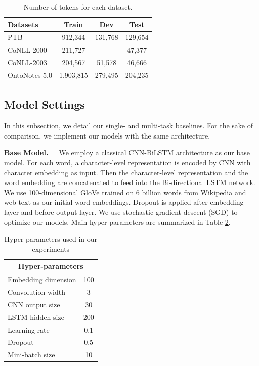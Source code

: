 \documentclass[letterpaper]{article} %
\begin{document}
\begin{table}[thbp]
\centering
\begin{tabular}{lccc}
\toprule
Datasets & Train & Dev & Test \\ \midrule
PTB & 912,344 & 131,768 & 129,654 \\
CoNLL-2000 & 211,727 & - & 47,377 \\
CoNLL-2003 & 204,567 & 51,578 & 46,666 \\
OntoNotes 5.0 & 1,903,815 & 279,495 & 204,235 \\ \bottomrule
\end{tabular}
\caption{Number of tokens for each dataset.}
\label{tb:ds}
\end{table}

\subsection{Model Settings}
In this subsection, we detail our single- and multi-task baselines. For the sake of comparison, we implement our models with the same architecture.

\textbf{Base Model.}\ \ \ We employ a classical CNN-BiLSTM architecture \cite{DBLP:conf/acl/MaH16} as our base model. For each word, a character-level representation is encoded by CNN with character embedding as input. Then the character-level representation and the word embedding are concatenated to feed into the Bi-directional LSTM \cite{DBLP:journals/neco/HochreiterS97} network. We use 100-dimensional GloVe \cite{DBLP:conf/emnlp/PenningtonSM14} trained on 6 billion words from Wikipedia and web text as our initial word embeddings. Dropout \cite{DBLP:journals/jmlr/SrivastavaHKSS14} is applied after embedding layer and before output layer. We use stochastic gradient descent (SGD) to optimize our models. Main hyper-parameters are summarized in Table \ref{tab:hyper}.

\begin{table}[htb]
\centering
\begin{tabular}{lc}
\toprule
\multicolumn{2}{c}{Hyper-parameters} \\ \midrule
Embedding dimension & 100 \\
Convolution width & 3 \\
CNN output size & 30 \\
LSTM hidden size & 200 \\
Learning rate & 0.1 \\
Dropout & 0.5 \\
Mini-batch size & 10 \\ \bottomrule
\end{tabular}
\caption{Hyper-parameters used in our experiments}
\label{tab:hyper}
\end{table}
\end{document}
